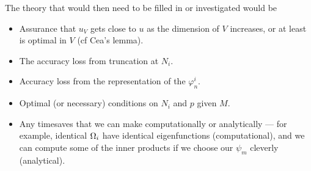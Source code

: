 \documentclass[11pt]{report}
\begin{document}
The theory that would then need to be filled in or investigated would be
\begin{itemize}
	\item Assurance that $u_V$ gets close to $u$ as the dimension of $V$ increases, or at least is optimal in $V$ (cf Cea's lemma).
	\item The accuracy loss from truncation at $N_i$.
	\item Accuracy loss from the representation of the $\varphi_n^i$.
	\item Optimal (or necessary) conditions on $N_i$ and $p$ given $M$.
	\item Any timesaves that we can make computationally or analytically --- for example, identical $\Omega_i$ have identical eigenfunctions (computational), and we can compute some of the inner products if we choose our $\psi_m$ cleverly (analytical).
\end{itemize}
\end{document}

